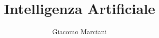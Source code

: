 \documentclass{amsbook}
\numberwithin{equation}{section}
\begin{document}
	
\newtheorem{definition}{Definition}

\title{Intelligenza Artificiale}

\author{Giacomo Marciani}

\address{University of Rome Tor Vergata}

\tableofcontents






%


%
\end{document}
